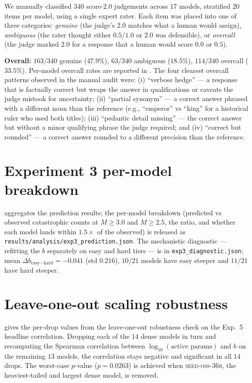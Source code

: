 \documentclass{article}
\newcommand{\sdi}{\ensuremath{b}}
\begin{document}
We manually classified $340$ score-$2.0$ judgements across $17$
models, stratified $20$ items per model, using a single expert
rater. Each item was placed into one of three categories:
\emph{genuine} (the judge's $2.0$ matches what a human would
assign), \emph{ambiguous} (the rater thought either $0.5$/$1.0$ or
$2.0$ was defensible), or \emph{overcall} (the judge marked $2.0$
for a response that a human would score $0.0$ or $0.5$).

\textbf{Overall:} $163/340$ genuine ($47.9\%$), $63/340$ ambiguous
($18.5\%$), $114/340$ overcall ($33.5\%$). Per-model overcall
rates are reported in . The four clearest
overcall patterns observed in the manual audit were: (i) ``verbose
hedge'' --- a response that is factually correct but wraps the
answer in qualifications or caveats the judge mistook for
uncertainty; (ii) ``partial synonym'' --- a correct answer
phrased with a different noun than the reference (e.g.,
``emperor'' vs ``king'' for a historical ruler who used both
titles); (iii) ``pedantic detail missing'' --- the correct answer
but without a minor qualifying phrase the judge required; and
(iv) ``correct but rounded'' --- a correct answer rounded to a
different precision than the reference.

\section{Experiment 3 per-model breakdown}\label{app:exp3}

 aggregates the prediction results; the per-model
breakdown (predicted vs observed catastrophic counts at
$M \geq 3.0$ and $M \geq 2.5$, the ratio, and whether each model
lands within $1.5\times$ of the observed) is released as
\texttt{results/analysis/exp3\_prediction.json}. The mechanistic
diagnostic --- refitting the \sdi{} separately on easy and hard
tiers --- is in \texttt{exp3\_diagnostic.json}; mean
$\Delta \sdi_{\text{easy}-\text{hard}} = -0.041$ (std $0.216$),
$10/21$ models have easy steeper and $11/21$ have hard steeper.

\section{Leave-one-out scaling robustness}\label{app:loo}

 gives the per-drop values from the leave-one-out
robustness check on the Exp.~5 headline correlation. Dropping each
of the $14$ dense models in turn and recomputing the Spearman
correlation between $\log_{10}(\text{active params})$ and \sdi{}
on the remaining $13$ models, the correlation stays negative and
significant in all $14$ drops. The worst-case $p$-value
($p = 0.0263$) is achieved when \textsc{seed-oss-36b}, the
heaviest-tailed and largest dense model, is removed.
\end{document}
